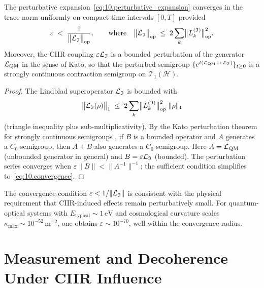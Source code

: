 \begin{theorem}
\label{thm:10.4}
The perturbative expansion~\eqref{eq:10.perturbative_expansion}
converges in the trace norm uniformly on compact time intervals
$[0,T]$ provided
\begin{equation}
\label{eq:10.convergence}
  \varepsilon
  \;<\;
  \frac{1}{\bigl\|\mathcal{L}_{\mathfrak{I}}\bigr\|_{\mathrm{op}}},
  \qquad\text{where}\quad
  \bigl\|\mathcal{L}_{\mathfrak{I}}\bigr\|_{\mathrm{op}}
  \;\leq\;
  2\sum_{k}\bigl\|L_k^{(\mathfrak{I})}\bigr\|_{\mathrm{op}}^2.
\end{equation}
Moreover, the CIIR coupling $\varepsilon\mathcal{L}_{\mathfrak{I}}$ is a
bounded perturbation of the generator $\mathcal{L}_{\mathrm{QM}}$ in the
sense of Kato, so that the perturbed semigroup
$\{e^{t(\mathcal{L}_{\mathrm{QM}}+\varepsilon\mathcal{L}_{\mathfrak{I}})}\}_{t\geq 0}$
is a strongly continuous contraction semigroup on
$\mathcal{T}_1(\mathcal{H})$.
\end{theorem}

\begin{proof}
The Lindblad superoperator $\mathcal{L}_{\mathfrak{I}}$ is bounded with
\[
  \bigl\|\mathcal{L}_{\mathfrak{I}}(\rho)\bigr\|_1
  \;\leq\;
  2\sum_k\bigl\|L_k^{(\mathfrak{I})}\bigr\|_{\mathrm{op}}^2\;\|\rho\|_1
\]
(triangle inequality plus sub-multiplicativity).  By the Kato
perturbation theorem for strongly continuous semigroups
\cite{kato1995}, if $B$ is a bounded operator and $A$ generates a
$C_0$-semigroup, then $A+B$ also generates a $C_0$-semigroup.  Here
$A=\mathcal{L}_{\mathrm{QM}}$ (unbounded generator in general) and
$B=\varepsilon\mathcal{L}_{\mathfrak{I}}$ (bounded).  The perturbation series
converges when $\varepsilon\|B\|<\|A^{-1}\|^{-1}$; the sufficient
condition simplifies to~\eqref{eq:10.convergence}.
\end{proof}

\begin{remark}
\label{rem:10.2}
The convergence condition $\varepsilon < 1/\|\mathcal{L}_{\mathfrak{I}}\|$ is
consistent with the physical requirement that CIIR-induced effects
remain perturbatively small.  For quantum-optical systems with
$E_{\mathrm{typical}}\sim 1\,\mathrm{eV}$ and cosmological curvature
scales $\kappa_{\max}\sim 10^{-52}\,\mathrm{m}^{-2}$, one obtains
$\varepsilon\sim 10^{-70}$, well within the convergence radius.
\end{remark}

\section{Measurement and Decoherence Under CIIR Influence}
\label{sec:ch10:measurement}

